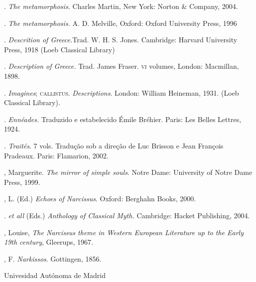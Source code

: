 \begin{description}
\titidem. \emph{The metamorphosis.} Charles Martin, New
York: Norton \& Company, 2004.

\titidem. \emph{The metamorphosis.} A. D. Melville,
Oxford: Oxford University Press, 1996

. \emph{Descrition of Greece}\emph{.}Trad. W. H. S.
Jones. Cambridge: Harvard University Press, 1918 (Loeb Classical
Library)

\titidem. \emph{\emph{Description of Greece.}} Trad.
James Fraser. \textsc{vi} volumes, London: Macmillan, 1898.

. \emph{Imagines}; \textsc{callistus}. \emph{Descriptions}.
London: William Heineman, 1931. (Loeb Classical Library).

. \emph{Ennéades.} Traduzido e estabelecido Émile Bréhier.
Paris: Les Belles Lettres, 1924.

\titidem. \emph{Traités}. 7 vols. Tradução sob a
direção
de Luc Brisson e Jean François Pradeaux. Paris: Flamarion, 2002.

, Marguerite.\emph{ The mirror of simple souls}.
Notre Dame: University of Notre Dame Press, 1999.

, L. (Ed.) \emph{Echoes of Narcissus}. Oxford: Berghahn Books,
2000.

. \emph{ et all} (Eds.) \emph{Anthology of Classical
Myth.} Cambridge: Hacket Publishing, 2004.

, Louise, \emph{The Narcissus theme in Western European
Literature up to the Early 19th century}, Gleerups, 1967\emph{.}

, F. \emph{Narkissos}. Gottingen, 1856.
\end{description}



%
	{Univesidad Autónoma de Madrid}






